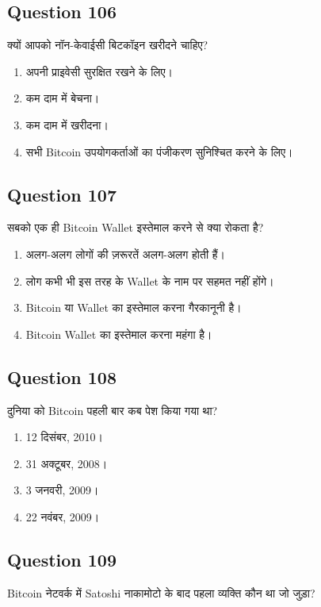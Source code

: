 \documentclass[12pt,a4paper]{article}
\begin{document}
\bigskip


\subsection*{Question 106}
क्यों आपको नॉन-केवाईसी बिटकॉइन खरीदने चाहिए?

\begin{enumerate}[label=\Alph*., leftmargin=*]
\item अपनी प्राइवेसी सुरक्षित रखने के लिए।
\item कम दाम में बेचना।
\item कम दाम में खरीदना।
\item सभी Bitcoin उपयोगकर्ताओं का पंजीकरण सुनिश्चित करने के लिए।
\end{enumerate}

\bigskip


\subsection*{Question 107}
सबको एक ही Bitcoin Wallet इस्तेमाल करने से क्या रोकता है?

\begin{enumerate}[label=\Alph*., leftmargin=*]
\item अलग-अलग लोगों की ज़रूरतें अलग-अलग होती हैं।
\item लोग कभी भी इस तरह के Wallet के नाम पर सहमत नहीं होंगे।
\item Bitcoin या Wallet का इस्तेमाल करना गैरकानूनी है।
\item Bitcoin Wallet का इस्तेमाल करना महंगा है।
\end{enumerate}

\bigskip


\subsection*{Question 108}
दुनिया को Bitcoin पहली बार कब पेश किया गया था?

\begin{enumerate}[label=\Alph*., leftmargin=*]
\item 12 दिसंबर, 2010।
\item 31 अक्टूबर, 2008।
\item 3 जनवरी, 2009।
\item 22 नवंबर, 2009।
\end{enumerate}

\bigskip


\subsection*{Question 109}
Bitcoin नेटवर्क में Satoshi नाकामोटो के बाद पहला व्यक्ति कौन था जो जुड़ा?
\end{document}
